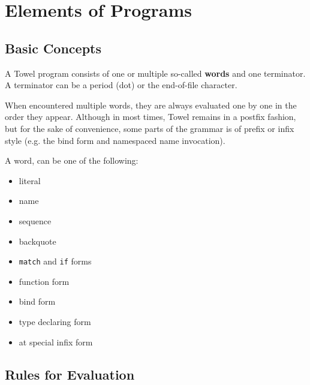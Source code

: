 \documentclass{book}
\begin{document}
\chapter{Elements of Programs}
\label{chap:forms}

\section{Basic Concepts}

A Towel program consists of one or multiple so-called \textbf{words} and one terminator. A terminator can be a period (dot) or the end-of-file character.

When encountered multiple words, they are always evaluated one by one in the order they appear. Although in most times, Towel remains in a postfix fashion, but for the sake of convenience, some parts of the grammar is of prefix or infix style (e.g. the bind form and namespaced name invocation).

A word, can be one of the following:
\begin{itemize}
\item literal
\item name
\item sequence
\item backquote
\item \texttt{match} and \texttt{if} forms
\item function form
\item bind form
\item type declaring form
\item at special infix form
\end{itemize}

\section{Rules for Evaluation}
\end{document}
